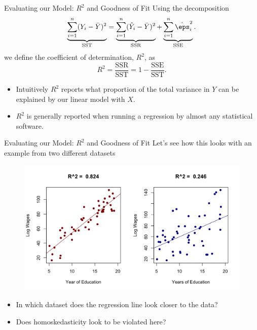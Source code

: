 \documentclass[notheorems, 9pt]{beamer}
\begin{document}
\begin{frame}{Evaluating our Model: \(R^2\) and Goodness of Fit} 
	\label{frame:f11}
	Using the decomposition
	\[
		\underbrace{\sum_{i=1}^n (Y_i - \bar Y)^2}_{\text{SST}} = \underbrace{\sum_{i=1}^n  (\hat Y_i - \bar Y)^2}_{\text{SSR}} +\underbrace{\sum_{i=1}^n \hat\eps_i^2}_{\text{SSE}}
	.\] 
	we define the coefficient of determination, \(R^2\), as
	\[
		R^2 = \frac{\text{SSR}}{\text{SST}} = 1 - \frac{\text{SSE}}{\text{SST}}  
	.\]
	\onslide<2->
	\begin{itemize}
		\item<2-> Intuitively \(R^2\) reports what proportion of the total variance in  \(Y\) can be explained by our linear model with  \(X\). 
		\item<3-> \(R^2\) is generally reported when running a regression by almost any statistical software.
	\end{itemize}
\end{frame}
\begin{frame}{Evaluating our Model: \(R^2\) and Goodness of Fit} 
	\label{frame:f12}
	Let's see how this looks with an example from two different datasets
	\begin{figure}[htpb]
		\centering
		\includegraphics[width=0.8\linewidth]{R2.png}
	\end{figure}
	\begin{itemize}
		\item<2-> In which dataset does the regression line look closer to the data?
		\item<3-> Does homoskedasticity look to be violated here?
	\end{itemize}
\end{frame}
\end{document}
